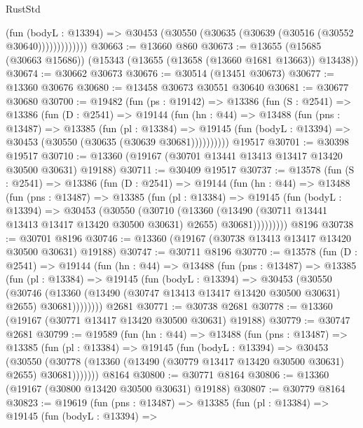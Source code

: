 \begin{lexlean}{RustStd}
\begin{coremodule}
                  (fun (bodyL : @13394) =>
                  @30453 (@30550 (@30635 (@30639 (@30516 (@30552 @30640)))))))))))))
@30663 := @13660 @860
@30673 := @13655 (@15685 (@30663 @15686)) (@15343 (@13655 (@13658 (@13660 @1681 @13663)) @13438))
@30674 := @30662 @30673
@30676 := @30514 (@13451 @30673)
@30677 := @13360 @30676
@30680 := @13458 @30673 @30551 @30640
@30681 := @30677 @30680
@30700 := @19482
    (fun (ps : @19142) =>
    @13386
      (fun (S : @2541) =>
      @13386
        (fun (D : @2541) =>
        @19144
          (fun (hn : @44) =>
          @13488
            (fun (pns : @13487) =>
            @13385
              (fun (pl : @13384) =>
              @19145 (fun (bodyL : @13394) => @30453 (@30550 (@30635 (@30639 @30681))))))))))
    @19517
@30701 := @30398 @19517
@30710 := @13360 (@19167 (@30701 @13441 @13413 @13417 @13420 @30500 @30631) @19188)
@30711 := @30409 @19517
@30737 := @13578
    (fun (S : @2541) =>
    @13386
      (fun (D : @2541) =>
      @19144
        (fun (hn : @44) =>
        @13488
          (fun (pns : @13487) =>
          @13385
            (fun (pl : @13384) =>
            @19145
              (fun (bodyL : @13394) =>
              @30453
                (@30550
                  (@30710
                    (@13360
                      (@13490 (@30711 @13441 @13413 @13417 @13420 @30500 @30631) @2655)
                      @30681)))))))))
    @8196
@30738 := @30701 @8196
@30746 := @13360 (@19167 (@30738 @13413 @13417 @13420 @30500 @30631) @19188)
@30747 := @30711 @8196
@30770 := @13578
    (fun (D : @2541) =>
    @19144
      (fun (hn : @44) =>
      @13488
        (fun (pns : @13487) =>
        @13385
          (fun (pl : @13384) =>
          @19145
            (fun (bodyL : @13394) =>
            @30453
              (@30550
                (@30746
                  (@13360 (@13490 (@30747 @13413 @13417 @13420 @30500 @30631) @2655) @30681))))))))
    @2681
@30771 := @30738 @2681
@30778 := @13360 (@19167 (@30771 @13417 @13420 @30500 @30631) @19188)
@30779 := @30747 @2681
@30799 := @19589
    (fun (hn : @44) =>
    @13488
      (fun (pns : @13487) =>
      @13385
        (fun (pl : @13384) =>
        @19145
          (fun (bodyL : @13394) =>
          @30453
            (@30550
              (@30778 (@13360 (@13490 (@30779 @13417 @13420 @30500 @30631) @2655) @30681)))))))
    @8164
@30800 := @30771 @8164
@30806 := @13360 (@19167 (@30800 @13420 @30500 @30631) @19188)
@30807 := @30779 @8164
@30823 := @19619
    (fun (pns : @13487) =>
    @13385
      (fun (pl : @13384) =>
      @19145
        (fun (bodyL : @13394) =>

\end{coremodule}
\end{lexlean}
